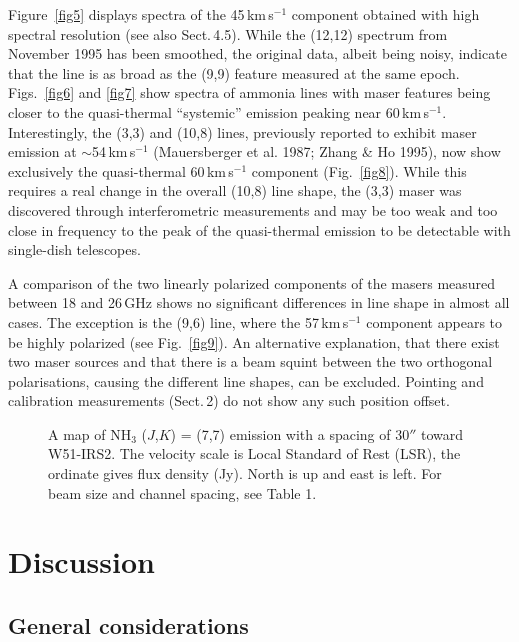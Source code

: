 \documentclass[oldversion]{aa}
\begin{document}
Figure~\ref{fig5} displays spectra of the 45\,km\,s$^{-1}$ component 
obtained with high spectral resolution (see also Sect.\,4.5). 
While the (12,12) spectrum from November 1995 has been smoothed, the 
original data, albeit being noisy, indicate that the line is as broad 
as the (9,9) feature measured at the same epoch. Figs.~\ref{fig6} and 
\ref{fig7} show spectra of ammonia lines with maser features being 
closer to the quasi-thermal ``systemic'' emission peaking near 
60\,km\,s$^{-1}$. Interestingly, the (3,3) and (10,8) lines, previously 
reported to exhibit maser emission at $\sim$54\,km\,s$^{-1}$
(Mauersberger et al. 1987; Zhang \& Ho 1995), now show exclusively 
the quasi-thermal 60\,km\,s$^{-1}$ component (Fig.~\ref{fig8}). While 
this requires a real change in the overall (10,8) line shape, the 
(3,3) maser was discovered through interferometric measurements and 
may be too weak and too close in frequency to the peak of the 
quasi-thermal emission to be detectable with single-dish telescopes.

A comparison of the two linearly polarized components of the masers 
measured between 18 and 26\,GHz shows no significant differences
in line shape in almost all cases. The exception is the (9,6) line,
where the 57\,km\,s$^{-1}$ component appears to be highly polarized
(see Fig.~\ref{fig9}). An alternative explanation, that there exist
two maser sources and that there is a beam squint between the two 
orthogonal polarisations, causing the different line shapes, can be 
excluded. Pointing and calibration measurements (Sect.\,2) do not
show any such position offset.


\begin{figure}[t]
\vspace{0.0cm}
\centering
{}
\vspace{-0.3cm}
\caption{A map of NH$_3$ ($J$,$K$) = (7,7) emission with a spacing of 
30$''$ toward W51-IRS2. The velocity scale is Local Standard of Rest (LSR), 
the ordinate gives flux density (Jy). North is up and east is left.  
For beam size and channel spacing, see Table 1.
\label{fig4}}
\end{figure}


\section{Discussion}

\subsection{General considerations}
\end{document}
